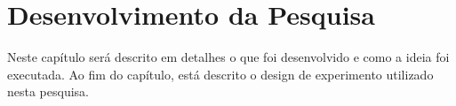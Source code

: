 
\chapter{Desenvolvimento da Pesquisa}
    \label{cha:desenvolvimento-da-pesquisa}


    Neste capítulo será descrito em detalhes o que foi desenvolvido e como a ideia foi executada. Ao fim do capítulo, está descrito o design de experimento utilizado nesta pesquisa.
    

    

    

    

